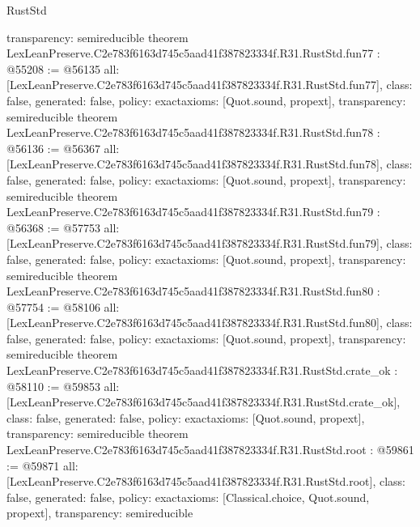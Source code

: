 \begin{lexlean}{RustStd}
\begin{coremodule}
{  transparency: semireducible
}
theorem LexLeanPreserve.C2e783f6163d745c5aad41f387823334f.R31.RustStd.fun77 : @55208 := @56135 {
  all: [LexLeanPreserve.C2e783f6163d745c5aad41f387823334f.R31.RustStd.fun77],
  class: false,
  generated: false,
  policy: exact{axioms: [Quot.sound, propext]},
  transparency: semireducible
}
theorem LexLeanPreserve.C2e783f6163d745c5aad41f387823334f.R31.RustStd.fun78 : @56136 := @56367 {
  all: [LexLeanPreserve.C2e783f6163d745c5aad41f387823334f.R31.RustStd.fun78],
  class: false,
  generated: false,
  policy: exact{axioms: [Quot.sound, propext]},
  transparency: semireducible
}
theorem LexLeanPreserve.C2e783f6163d745c5aad41f387823334f.R31.RustStd.fun79 : @56368 := @57753 {
  all: [LexLeanPreserve.C2e783f6163d745c5aad41f387823334f.R31.RustStd.fun79],
  class: false,
  generated: false,
  policy: exact{axioms: [Quot.sound, propext]},
  transparency: semireducible
}
theorem LexLeanPreserve.C2e783f6163d745c5aad41f387823334f.R31.RustStd.fun80 : @57754 := @58106 {
  all: [LexLeanPreserve.C2e783f6163d745c5aad41f387823334f.R31.RustStd.fun80],
  class: false,
  generated: false,
  policy: exact{axioms: [Quot.sound, propext]},
  transparency: semireducible
}
theorem LexLeanPreserve.C2e783f6163d745c5aad41f387823334f.R31.RustStd.crate_ok : @58110 := @59853 {
  all: [LexLeanPreserve.C2e783f6163d745c5aad41f387823334f.R31.RustStd.crate_ok],
  class: false,
  generated: false,
  policy: exact{axioms: [Quot.sound, propext]},
  transparency: semireducible
}
theorem LexLeanPreserve.C2e783f6163d745c5aad41f387823334f.R31.RustStd.root : @59861 := @59871 {
  all: [LexLeanPreserve.C2e783f6163d745c5aad41f387823334f.R31.RustStd.root],
  class: false,
  generated: false,
  policy: exact{axioms: [Classical.choice, Quot.sound, propext]},
  transparency: semireducible
}


\end{coremodule}
\end{lexlean}
